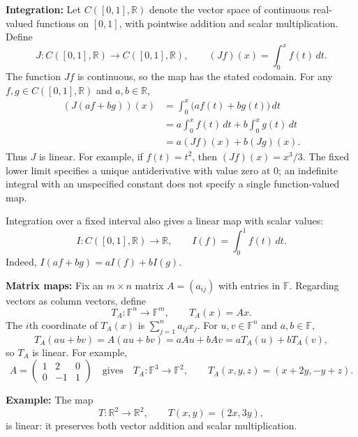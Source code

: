 \documentclass[a4paper,11pt,abstract=true]{scrartcl}
\theoremstyle{dotlessP}
\theoremstyle{dotlessS}
\theoremstyle{remark}
\theoremstyle{definition}
\begin{document}
\begin{claim_box}
\textbf{Integration:} Let $C([0,1],\mathbb{R})$ denote
the vector space of continuous real-valued functions on $[0,1]$, with
pointwise addition and scalar multiplication. Define
\[
J:C([0,1],\mathbb{R})\longrightarrow C([0,1],\mathbb{R}),
\qquad (Jf)(x)=\int_0^x f(t)\,dt.
\]
The function $Jf$ is continuous, so the map has the stated codomain.
For any $f,g\in C([0,1],\mathbb{R})$ and $a,b\in\mathbb{R}$,
\[
\begin{aligned}
(J(af+bg))(x)
&=\int_0^x \bigl(af(t)+bg(t)\bigr)\,dt\\
&=a\int_0^x f(t)\,dt+b\int_0^x g(t)\,dt\\
&=a(Jf)(x)+b(Jg)(x).
\end{aligned}
\]
Thus $J$ is linear. For example, if $f(t)=t^2$, then $(Jf)(x)=x^3/3$.
The fixed lower limit specifies a unique antiderivative with value zero
at $0$; an indefinite integral with an unspecified constant does not
specify a single function-valued map.

Integration over a fixed interval also gives a linear map with scalar
values:
\[
I:C([0,1],\mathbb{R})\longrightarrow\mathbb{R},
\qquad I(f)=\int_0^1 f(t)\,dt.
\]
Indeed, $I(af+bg)=aI(f)+bI(g)$.
\end{claim_box}

\begin{claim_box}
\textbf{Matrix maps:} Fix an $m\times n$ matrix
$A=(a_{ij})$ with entries in $\mathbb{F}$. Regarding vectors as column
vectors, define
\[
T_A:\mathbb{F}^n\longrightarrow\mathbb{F}^m,
\qquad T_A(x)=Ax.
\]
The $i$th coordinate of $T_A(x)$ is $\sum_{j=1}^n a_{ij}x_j$.
For $u,v\in\mathbb{F}^n$ and $a,b\in\mathbb{F}$,
\[
T_A(au+bv)=A(au+bv)=aAu+bAv=aT_A(u)+bT_A(v),
\]
so $T_A$ is linear. For example,
\[
A=\begin{pmatrix}1&2&0\\0&-1&1\end{pmatrix}
\quad\text{gives}\quad
T_A:\mathbb{F}^3\longrightarrow\mathbb{F}^2,
\qquad T_A(x,y,z)=(x+2y,-y+z).
\]
\end{claim_box}

\begin{example_box}
\textbf{Example:} The map
\[
T:\mathbb{R}^2\longrightarrow\mathbb{R}^2,
\qquad T(x,y)=(2x,3y),
\]
is linear: it preserves both vector addition and scalar multiplication.
\end{example_box}
\end{document}
